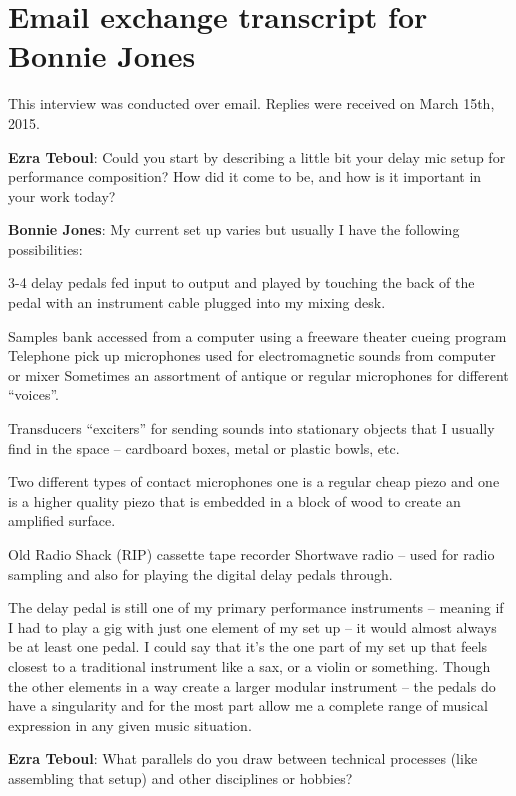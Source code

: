 \newpage

\clearpage 
\section{Email exchange transcript for Bonnie Jones}

This interview was conducted over email. Replies were received on March 15th, 2015. 

\textbf{Ezra Teboul}: Could you start by describing a little bit your delay \/ mic setup for performance \/ composition? How did it come to be, and how is it important in your work today?

\textbf{Bonnie Jones}: My current set up varies but usually I have the following possibilities: 

3-4 delay pedals fed input to output and played by touching the back of the pedal with an instrument cable plugged into my mixing desk. 

Samples bank accessed from a computer using a freeware theater cueing program 
Telephone pick up microphones used for electromagnetic sounds from computer or mixer
Sometimes an assortment of antique or regular microphones for different ``voices''.
 
Transducers ``exciters'' for sending sounds into stationary objects that I usually find in the space – cardboard boxes, metal or plastic bowls, etc.
 
Two different types of contact microphones one is a regular cheap piezo and one is a higher quality piezo that is embedded in a block of wood to create an amplified surface. 

Old Radio Shack (RIP) cassette tape recorder Shortwave radio – used for radio sampling and also for playing the digital delay pedals through. 

The delay pedal is still one of my primary performance instruments – meaning if I had to play a gig with just one element of my set up – it would almost always be at least one pedal. I could say that it’s the one part of my set up that feels closest to a traditional instrument like a sax, or a violin or something. Though the other elements in a way create a larger modular instrument – the pedals do have a singularity and for the most part allow me a complete range of musical expression in any given music situation. 

\textbf{Ezra Teboul}: What parallels do you draw between technical processes (like assembling that setup) and other disciplines or hobbies? 

